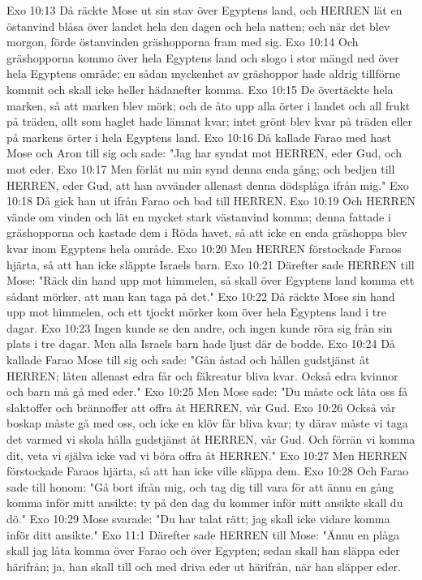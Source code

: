 Exo 10:13  Då räckte Mose ut sin stav över Egyptens land, och HERREN lät en östanvind blåsa över landet hela den dagen och hela natten; och när det blev morgon, förde östanvinden gräshopporna fram med sig.
Exo 10:14  Och gräshopporna kommo över hela Egyptens land och slogo i stor mängd ned över hela Egyptens område; en sådan myckenhet av gräshoppor hade aldrig tillförne kommit och skall icke heller hädanefter komma.
Exo 10:15  De övertäckte hela marken, så att marken blev mörk; och de åto upp alla örter i landet och all frukt på träden, allt som haglet hade lämnat kvar; intet grönt blev kvar på träden eller på markens örter i hela Egyptens land.
Exo 10:16  Då kallade Farao med hast Mose och Aron till sig och sade: "Jag har syndat mot HERREN, eder Gud, och mot eder.
Exo 10:17  Men förlåt nu min synd denna enda gång; och bedjen till HERREN, eder Gud, att han avvänder allenast denna dödsplåga ifrån mig."
Exo 10:18  Då gick han ut ifrån Farao och bad till HERREN.
Exo 10:19  Och HERREN vände om vinden och lät en mycket stark västanvind komma; denna fattade i gräshopporna och kastade dem i Röda havet, så att icke en enda gräshoppa blev kvar inom Egyptens hela område.
Exo 10:20  Men HERREN förstockade Faraos hjärta, så att han icke släppte Israels barn.
Exo 10:21  Därefter sade HERREN till Mose: "Räck din hand upp mot himmelen, så skall över Egyptens land komma ett sådant mörker, att man kan taga på det."
Exo 10:22  Då räckte Mose sin hand upp mot himmelen, och ett tjockt mörker kom över hela Egyptens land i tre dagar.
Exo 10:23  Ingen kunde se den andre, och ingen kunde röra sig från sin plats i tre dagar. Men alla Israels barn hade ljust där de bodde.
Exo 10:24  Då kallade Farao Mose till sig och sade: "Gån åstad och hållen gudstjänst åt HERREN; låten allenast edra får och fäkreatur bliva kvar. Också edra kvinnor och barn må gå med eder."
Exo 10:25  Men Mose sade: "Du måste ock låta oss få slaktoffer och brännoffer att offra åt HERREN, vår Gud.
Exo 10:26  Också vår boskap måste gå med oss, och icke en klöv får bliva kvar; ty därav måste vi taga det varmed vi skola hålla gudstjänst åt HERREN, vår Gud. Och förrän vi komma dit, veta vi själva icke vad vi böra offra åt HERREN."
Exo 10:27  Men HERREN förstockade Faraos hjärta, så att han icke ville släppa dem.
Exo 10:28  Och Farao sade till honom: "Gå bort ifrån mig, och tag dig till vara för att ännu en gång komma inför mitt ansikte; ty på den dag du kommer inför mitt ansikte skall du dö."
Exo 10:29  Mose svarade: "Du har talat rätt; jag skall icke vidare komma inför ditt ansikte."
Exo 11:1  Därefter sade HERREN till Mose: "Ännu en plåga skall jag låta komma över Farao och över Egypten; sedan skall han släppa eder härifrån; ja, han skall till och med driva eder ut härifrån, när han släpper eder.
